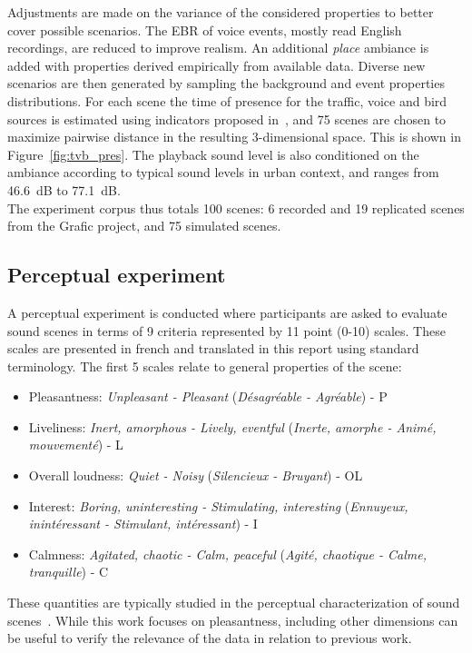 \documentclass[11pt,a4paper]{article}
\begin{document}
Adjustments are made on the variance of the considered properties to better cover possible scenarios. The EBR of voice events, mostly read English recordings, are reduced to improve realism. An additional \textit{place} ambiance is added with properties derived empirically from available data. Diverse new scenarios are then generated by sampling the background and event properties distributions. For each scene the time of presence for the traffic, voice and bird sources is estimated using indicators proposed in~\cite{gontier2018}, and 75 scenes are chosen to maximize pairwise distance in the resulting 3-dimensional space. This is shown in Figure~\ref{fig:tvb_pres}. The playback sound level is also conditioned on the ambiance according to typical sound levels in urban context, and ranges from 46.6~dB to 77.1~dB.\\

The experiment corpus thus totals 100 scenes: 6 recorded and 19 replicated scenes from the Grafic project, and 75 simulated scenes.


\subsection{Perceptual experiment}
\label{sec:data_exp}

A perceptual experiment is conducted where participants are asked to evaluate sound scenes in terms of 9 criteria represented by 11 point (0-10) scales. These scales are presented in french and translated in this report using standard terminology. The first 5 scales relate to general properties of the scene:
\begin{itemize}
\item Pleasantness: \textit{Unpleasant - Pleasant} (\textit{D\'esagr\'eable - Agr\'eable}) - P
\item Liveliness: \textit{Inert, amorphous - Lively, eventful} (\textit{Inerte, amorphe - Anim\'e, mouvement\'e}) - L
\item Overall loudness: \textit{Quiet - Noisy} (\textit{Silencieux - Bruyant}) - OL
\item Interest: \textit{Boring, uninteresting - Stimulating, interesting} (\textit{Ennuyeux, inint\'eressant - Stimulant, int\'eressant}) - I
\item Calmness: \textit{Agitated, chaotic - Calm, peaceful} (\textit{Agit\'e, chaotique - Calme, tranquille}) - C
\end{itemize}

These quantities are typically studied in the perceptual characterization of sound scenes~\cite{axelsson2010, aumond2017, nilsson2007}. While this work focuses on pleasantness, including other dimensions can be useful to verify the relevance of the data in relation to previous work.\\
\end{document}
